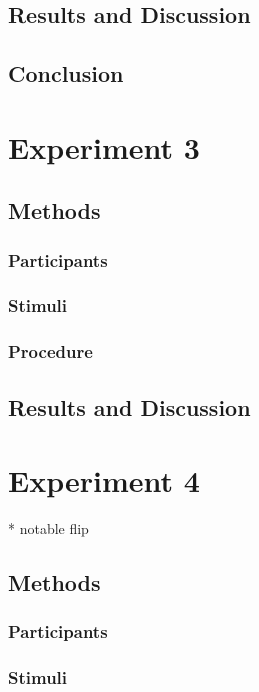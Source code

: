 \documentclass[man]{apa2}
\begin{document}
\subsection{Results and Discussion}

\subsection{Conclusion}



\section{Experiment 3}

\subsection{Methods}

\subsubsection{Participants} 
\subsubsection{Stimuli}


\subsubsection{Procedure}

\subsection{Results and Discussion}

\section{Experiment 4}
* notable flip

\subsection{Methods}

\subsubsection{Participants} 
\subsubsection{Stimuli}
\end{document}
